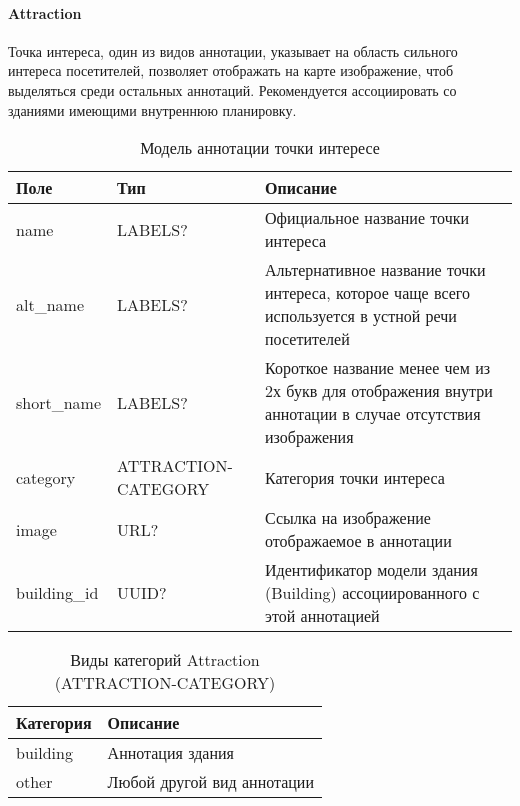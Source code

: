       \paragraph{Attraction}
        Точка интереса, один из видов аннотации, указывает на область сильного интереса посетителей, позволяет отображать на карте изображение, чтоб выделяться среди остальных аннотаций. Рекомендуется ассоциировать со зданиями имеющими внутреннюю планировку.
        \begin{center}
          \begin{xltabular}{\linewidth}{|l|p{4cm}|X|}
            \caption{Модель аннотации точки интересе}\\\hline
            Поле        & Тип                 & Описание                                                                                                \\ \hline
            name        & LABELS?             & Официальное название точки интереса                                                                     \\ \hline
            alt\_name   & LABELS?             & Альтернативное название точки интереса, которое чаще всего используется в устной речи посетителей       \\ \hline
            short\_name & LABELS?             & Короткое название менее чем из 2х букв для отображения внутри аннотации в случае отсутствия изображения \\ \hline
            category    & ATTRACTION-CATEGORY & Категория точки интереса                                                                                \\ \hline
            image       & URL?                & Ссылка на изображение отображаемое в аннотации                                                          \\ \hline
            building\_id& UUID?               & Идентификатор модели здания (Building) ассоциированного с этой аннотацией                               \\ \hline
          \end{xltabular}
        \end{center}
        \begin{center}
          \begin{xltabular}{\linewidth}{|l|X|}
            \caption{Виды категорий Attraction (ATTRACTION-CATEGORY)}\\           \hline
            Категория & Описание                   \\ \hline
            building  & Аннотация здания           \\ \hline
            other     & Любой другой вид аннотации \\ \hline
          \end{xltabular}
        \end{center}


